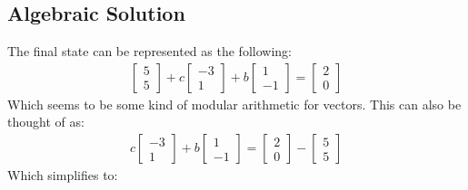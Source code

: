 \documentclass[letterpaper, 12pt]{article}
\begin{document}
\subsection{Algebraic Solution}
The final state can be represented as the following:
\begin{align*}
\begin{bmatrix}
    5\\
    5
\end{bmatrix}
+ c
\begin{bmatrix}
    -3\\
    1
\end{bmatrix}
+ b
\begin{bmatrix}
    1\\
    -1
\end{bmatrix}
 =
\begin{bmatrix}
    2\\
    0
\end{bmatrix}
\end{align*}
Which seems to be some kind of modular arithmetic for vectors.
This can also be thought of as:
\begin{align*}
c
\begin{bmatrix}
    -3\\
    1
\end{bmatrix}
+ b
\begin{bmatrix}
    1\\
    -1
\end{bmatrix}
=
\begin{bmatrix}
    2\\
    0
\end{bmatrix}
 -
\begin{bmatrix}
    5\\
    5
\end{bmatrix}
\end{align*}
Which simplifies to:
\end{document}
